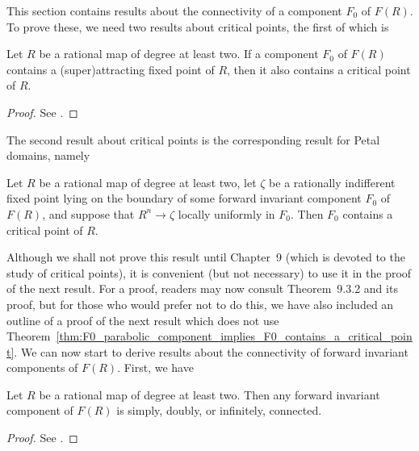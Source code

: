 This section contains results about the connectivity of a component $F_0$ of
$F(R)$. To prove these, we need two results about critical points, the first of
which is

\begin{theorem}
    \label{thm:F0_attracting_component_implies_F0_contains_a_critical_point}
    Let $R$ be a rational map of degree at least two. If a component $F_0$ of
    $F(R)$ contains a (super)attracting fixed point of $R$, then it also
    contains a critical point of $R$.
\end{theorem}
\begin{proof}
    See \cite[172--173]{Beardon1991}.
\end{proof}

The second result about critical points is the corresponding result for Petal
domains, namely

\begin{theorem}
    \label{thm:F0_parabolic_component_implies_F0_contains_a_critical_point}
    Let $R$ be a rational map of degree at least two, let $\zeta$ be a
    rationally indifferent fixed point lying on the boundary of some forward
    invariant component $F_0$ of $F(R)$, and suppose that $R^n \to \zeta$
    locally uniformly in $F_0$. Then $F_0$ contains a critical point of $R$.
\end{theorem}

Although we shall not prove this result until Chapter~9 \cite{Beardon1991}
(which is devoted to the study of critical points), it is convenient (but not
necessary) to use it in the proof of the next result. For a proof, readers may
now consult Theorem~9.3.2 \cite{Beardon1991} and its proof, but for those who
would prefer not to do this, we have also included an outline of a proof of the
next result which does not use
Theorem~\ref{thm:F0_parabolic_component_implies_F0_contains_a_critical_point}.
We can now start to derive results about the connectivity of forward invariant
components of $F(R)$. First, we have

\begin{theorem}
    \label{thm:F0_forward_invariant_implies_cF0_is_1_2_or_infty}
    Let $R$ be a rational map of degree at least two. Then any forward invariant
    component of $F(R)$ is simply, doubly, or infinitely, connected.
\end{theorem}
\begin{proof}
    See \cite[173]{Beardon1991}.
\end{proof}

